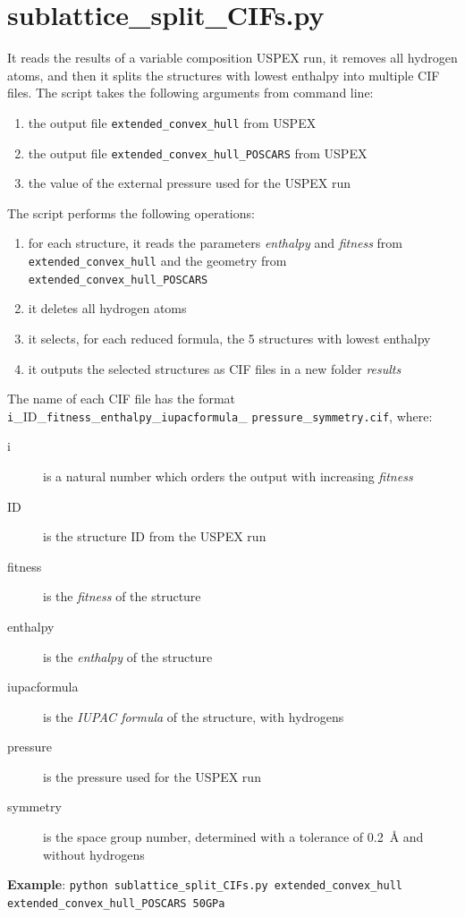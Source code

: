 \documentclass{article}
\begin{document}
\section{sublattice\_split\_CIFs.py}
It reads the results of a variable composition USPEX run, it removes all hydrogen atoms, and then it splits the structures with lowest enthalpy into multiple CIF files. The script takes the following arguments from command line:
\begin{enumerate}
	\item the output file \texttt{extended\_convex\_hull} from USPEX
	\item the output file \texttt{extended\_convex\_hull\_POSCARS} from USPEX
	\item the value of the external pressure used for the USPEX run
\end{enumerate}
The script performs the following operations:
\begin{enumerate}
	\item for each structure, it reads the parameters \emph{enthalpy} and \emph{fitness} from \texttt{extended\_convex\_hull} and the geometry from \texttt{extended\_convex\_hull\_POSCARS}
	\item it deletes all hydrogen atoms
	\item it selects, for each reduced formula, the 5 structures with lowest enthalpy
	\item it outputs the selected structures as CIF files in a new folder \textit{results}
\end{enumerate}
The name of each CIF file has the format \texttt{i}\_ID\_\texttt{fitness}\_\texttt{enthalpy}\_\texttt{iupacformula}\_ \texttt{pressure}\_\texttt{symmetry.cif}, where:
\begin{description}
	\item[i] is a natural number which orders the output with increasing \emph{fitness}
	\item[ID] is the structure ID from the USPEX run
	\item[fitness] is the \emph{fitness} of the structure
	\item[enthalpy] is the \emph{enthalpy} of the structure
	\item[iupacformula] is the \emph{IUPAC formula} of the structure, with hydrogens
	\item[pressure] is the pressure used for the USPEX run
	\item[symmetry] is the space group number, determined with a tolerance of 0.2~\AA{} and without hydrogens
\end{description}
\textbf{Example}: \texttt{python sublattice\_split\_CIFs.py extended\_convex\_hull \\ extended\_convex\_hull\_POSCARS 50GPa}
\end{document}
